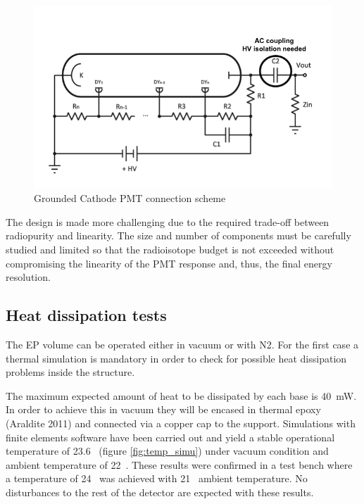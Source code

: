 \documentclass[a4paper, 10pt, oneside, twocolumn, 3p]{elsarticle}
\begin{document}
\begin{figure} [H]
	\begin{center}
		\includegraphics[width=.4\textwidth]{./figures/AC_diagram.png}
		\caption{Grounded Cathode PMT connection scheme}
		\label{fig:grounded_cathode}
	\end{center}
\end{figure}


\par The design is made more challenging due to the required trade-off between radiopurity and linearity. The size and number of components must be carefully studied and limited so that the radioisotope budget is not exceeded without compromising the linearity of the PMT response and, thus, the final energy resolution.



\subsection {Heat dissipation tests}

\par The EP volume can be operated either in vacuum or with N2. For the first case a thermal simulation is mandatory in order to check for possible heat dissipation problems inside the structure.

\par The maximum expected amount of heat to be dissipated by each base is 40~mW. In order to achieve this in vacuum they will be encased in thermal epoxy (Araldite 2011\textregistered) and connected via a copper cap to the support. Simulations with finite elements software have been carried out and yield a stable operational temperature of 23.6~ (figure \ref{fig:temp_simu}) under vacuum condition and ambient temperature of 22~. These results were confirmed in a test bench where a temperature of 24~ was achieved with 21~ ambient temperature. No disturbances to the rest of the detector are expected with these results. 
 
\end{document}
